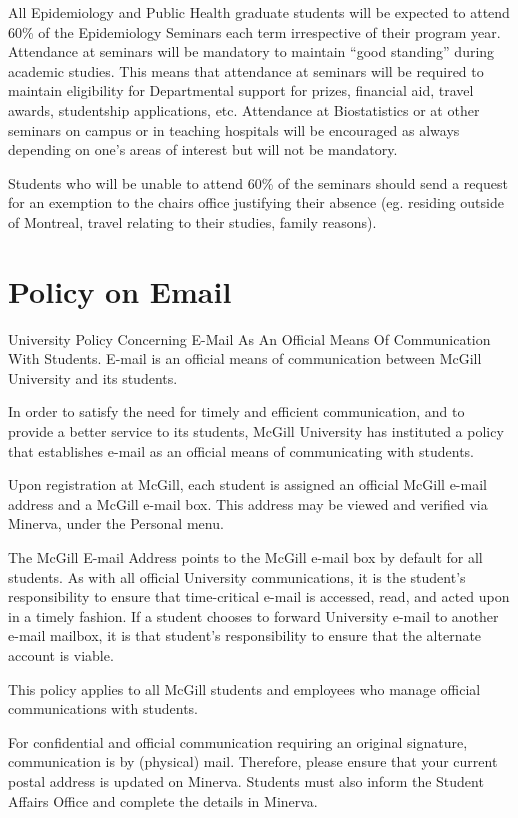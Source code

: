 \documentclass[
]{book}
\begin{document}
All Epidemiology and Public Health graduate students will be expected to attend 60\% of the Epidemiology Seminars each term irrespective of their program year. Attendance at seminars will be mandatory to maintain ``good standing'' during academic studies. This means that attendance at seminars will be required to maintain eligibility for Departmental support for prizes, financial aid, travel awards, studentship applications, etc. Attendance at Biostatistics or at other seminars on campus or in teaching hospitals will be encouraged as always depending on one's areas of interest but will not be mandatory.

Students who will be unable to attend 60\% of the seminars should send a request for an exemption to the chairs office justifying their absence (eg. residing outside of Montreal, travel relating to their studies, family reasons).

\hypertarget{policy-on-email}{%
\section{Policy on Email}\label{policy-on-email}}

University Policy Concerning E-Mail As An Official Means Of Communication With Students. E-mail is an official means of communication between McGill University and its students.

In order to satisfy the need for timely and efficient communication, and to provide a better service to its students, McGill University has instituted a policy that establishes e-mail as an official means of communicating with students.

Upon registration at McGill, each student is assigned an official McGill e-mail address and a McGill e-mail box. This address may be viewed and verified via Minerva, under the Personal menu.

The McGill E-mail Address points to the McGill e-mail box by default for all students. As with all official University communications, it is the student's responsibility to ensure that time-critical e-mail is accessed, read, and acted upon in a timely fashion. If a student chooses to forward University e-mail to another e-mail mailbox, it is that student's responsibility to ensure that the alternate account is viable.

This policy applies to all McGill students and employees who manage official communications with students.

For confidential and official communication requiring an original signature, communication is by (physical) mail. Therefore, please ensure that your current postal address is updated on Minerva. Students must also inform the Student Affairs Office and complete the details in Minerva.
\end{document}
